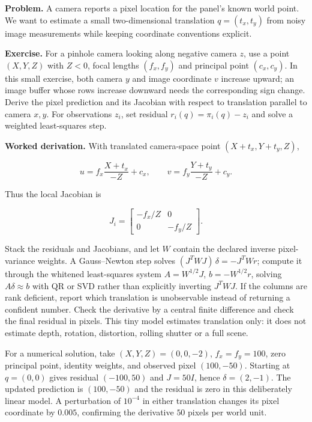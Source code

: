 \textbf{Problem.} A camera reports a pixel location for the panel's known world point. We want to estimate a small two-dimensional translation \(q=(t_x,t_y)\) from noisy image measurements while keeping coordinate conventions explicit.

\textbf{Exercise.} For a pinhole camera looking along negative camera \(z\), use a point \((X,Y,Z)\) with \(Z<0\), focal lengths \((f_x,f_y)\) and principal point \((c_x,c_y)\). In this small exercise, both camera \(y\) and image coordinate \(v\) increase upward; an image buffer whose rows increase downward needs the corresponding sign change. Derive the pixel prediction and its Jacobian with respect to translation parallel to camera \(x,y\). For observations \(z_i\), set residual \(r_i(q)=\pi_i(q)-z_i\) and solve a weighted least-squares step.

\textbf{Worked derivation.} With translated camera-space point \((X+t_x,Y+t_y,Z)\),

\[
u=f_x\frac{X+t_x}{-Z}+c_x,\qquad v=f_y\frac{Y+t_y}{-Z}+c_y.
\]

Thus the local Jacobian is

\[
J_i=\begin{bmatrix}-f_x/Z&0\\0&-f_y/Z\end{bmatrix}.
\]

Stack the residuals and Jacobians, and let \(W\) contain the declared inverse pixel-variance weights. A Gauss--Newton step solves \((J^TWJ)\,\delta=-J^TWr\); compute it through the whitened least-squares system \(A=W^{1/2}J\), \(b=-W^{1/2}r\), solving \(A\delta\approx b\) with QR or SVD rather than explicitly inverting \(J^TWJ\). If the columns are rank deficient, report which translation is unobservable instead of returning a confident number. Check the derivative by a central finite difference and check the final residual in pixels. This tiny model estimates translation only: it does not estimate depth, rotation, distortion, rolling shutter or a full scene.

For a numerical solution, take \((X,Y,Z)=(0,0,-2)\), \(f_x=f_y=100\), zero principal point, identity weights, and observed pixel \((100,-50)\). Starting at \(q=(0,0)\) gives residual \((-100,50)\) and \(J=50I\), hence \(\delta=(2,-1)\). The updated prediction is \((100,-50)\) and the residual is zero in this deliberately linear model. A perturbation of \(10^{-4}\) in either translation changes its pixel coordinate by \(0.005\), confirming the derivative \(50\) pixels per world unit.

